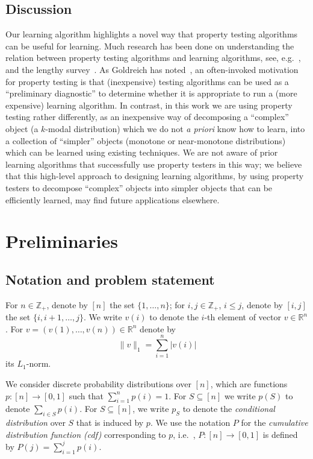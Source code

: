 \documentclass[10pt]{article}
\theoremstyle{definition}
\providecommand{\eg}{e.g.\ }
\providecommand{\ie}{i.e.\ }
\numberwithin{equation}{section}
\newcommand{\R}{{\mathbb R}}
\newcommand{\Z}{{\mathbb Z}}
\begin{document}
\subsection{Discussion}
Our learning algorithm highlights a novel way that property testing algorithms can be useful
for learning.  Much research has been done on understanding the relation between property testing
algorithms and learning algorithms, see, \eg, \cite{GGR98,KR00} and the lengthy survey~\cite{Ron:08testlearn}.  As Goldreich has noted~\cite{Goldreich:11web}, an often-invoked motivation for
property testing is that (inexpensive) testing algorithms can be used as a ``preliminary diagnostic''
to determine whether it is appropriate to run a (more expensive) learning algorithm.  In contrast, in this work we are using property testing rather differently, as an inexpensive way of decomposing a ``complex'' object (a $k$-modal
distribution) which we do not \emph{a priori} know how to learn, into a collection of ``simpler'' objects (monotone or near-monotone distributions) which can be learned using existing techniques.  We are not aware of prior learning algorithms that successfully use property testers in this way;
we believe that this high-level
approach to designing learning algorithms, by using property testers to decompose ``complex'' objects into simpler objects that can be efficiently learned, may find future applications elsewhere.


\section{Preliminaries} \label{sec:prelims}

\subsection{Notation and problem statement} \label{ssec:defs}
For $n \in \Z_+$, denote by $[n]$ the set $\{1, \ldots, n\}$;
for $i,j  \in \Z_+$, $i \leq j$, denote by $[i,j]$ the set $\{i, i+1, \ldots, j\}$.
We write $v(i)$ to denote the $i$-th element of vector $v \in \R^n$.
For $v=(v(1),\dots,v(n)) \in \R^n$ denote by 
\[
\|v\|_1 = \sum_{i=1}^n |v(i)|
\]
its $L_1$-norm.

We consider discrete probability distributions over $[n]$, which are
functions $p: [n] \to [0,1]$ such that $\sum_{i=1}^n p(i)=1$.
For $S \subseteq [n]$ we write $p(S)$ to denote $\sum_{i \in S} p(i)$.
 For $S \subseteq [n]$, we write $p_S$ to denote the \emph{conditional distribution}
over $S$ that is induced by $p$. We use the  notation $P$ for the
\emph{cumulative distribution function (cdf)} corresponding to $p$, \ie,
$P: [n] \to [0,1]$ is defined by $P(j) = \sum_{i=1}^j p(i)$.
\end{document}
